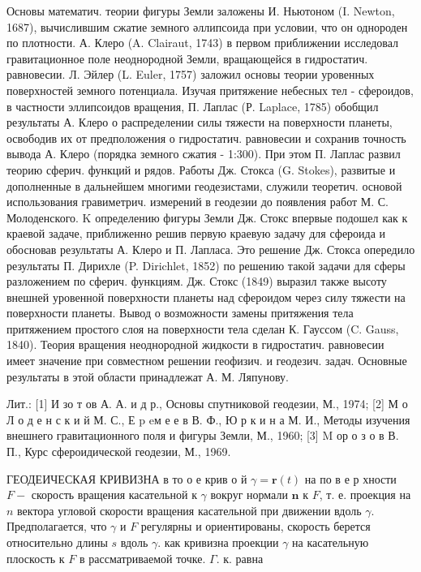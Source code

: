 \documentclass[10pt]{article}
\begin{document}
Основы математич. теории фигуры Земли заложены И. Ньютоном (I. Newton, 1687), вычислившим сжатие земного әллипсоида при условии, что он однороден по плотности. А. Клеро (A. Clairaut, 1743) в первом приближении исследовал гравитационное поле неоднородной Земли, вращающейся в гидростатич. равновесии. Л. Эйлер (L. Euler, 1757) заложил основы теории уровенных поверхностей земного потенциала. Изучая притяжение небесных тел - сфероидов, в частности эллипсоидов вращения, П. Лаплас (Р. Laplace, 1785) обобщил результаты А. Клеро о распределении силы тяжести на поверхности планеты, освободив их от предположения о гидростатич. равновесии и сохранив точность вывода А. Клеро (порядка земного сжатия - 1:300). При этом П. Лаплас развил теорию сферич. функций и рядов. Работы Дж. Стокса (G. Stokes), развитые и дополненные в дальнейшем многими геодезистами, служили теоретич. основой использования гравиметрич. измерений в геодезии до появления работ М. С. Молоденского. $\mathrm{K}$ определению фигуры Земли Дж. Стокс впервые подошел как к краевой задаче, приближенно решив первую краевую задачу для сфероида и обосновав результаты А. Клеро и П. Лапласа. Это решение Дж. Стокса опередило результаты П. Дирихле (P. Dirichlet, 1852) по решению такой задачи для сферы разложением по сферич. функциям. Дж. Стокс (1849) выразил также высоту внешней уровенной поверхности планеты над сфероидом через силу тяжести на поверхности планеты. Вывод о возможности замены притяжения тела притяжением простого слоя на поверхности тела сделан К. Гауссом (C. Gauss, 1840). Теория вращения неоднородной жидкости в гидростатич. равновесии имеет значение при совместном решении геофизич. и геодезич. задач. Основные результаты в этой области принадлежат А. М. Ляпунову.



Лит.: [1] И зо т ов А. А. и д р., Основы спутниковой геодезии, М., 1974; [2] М о Л о д е н с к и й М. С., Е $\mathrm{p}$ eм е е в В. Ф., Ю р к и н а М. И., Методы изучения внешнего гравитационного поля и фигуры Земли, М., 1960; [3] M ор о з о в В. П., Курс сфероидической геодезии, М., 1969.



ГЕОДЕИЧЕСКАЯ КРИВИЗНА в то о е крив о й $\gamma=\boldsymbol{r}(t)$ на по в е р хности $F-$ скорость вращения касательной к $\gamma$ вокруг нормали $\boldsymbol{n}$ к $F$, т. е. проекция на $n$ вектора угловой скорости вращения касательной при движении вдоль $\gamma$. Предполагается, что $\gamma$ и $F$ регулярны и ориентированы, скорость берется относительно длины $s$ вдоль $\gamma$. как кривизна проекции $\gamma$ на касательную плоскость к $F$ в рассматриваемой точке. $\Gamma$. к. равна
\end{document}

